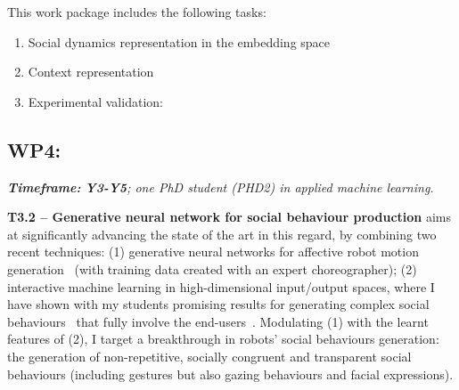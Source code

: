 %
%
%

This work package includes the following tasks:

\begin{enumerate}[label=\textbf{T3.\arabic*}]
    \item{Social dynamics representation in the embedding space}
    \item{Context representation}
    \item{Experimental validation: }
\end{enumerate}



\subsection{WP4: \textbf{\wpFour}}
\emph{    \textbf{Timeframe:} \textbf{Y3-Y5}; one PhD student (PHD2) in applied machine
    learning.}


\textbf{T3.2 -- Generative neural network for social behaviour production}
\project aims at significantly advancing the state of the art in this regard, by
combining two recent techniques: (1) generative neural networks for affective
robot motion generation~\cite{marmpena2019generating,suguitan2020moveae} (with
training data created with an expert choreographer); (2) interactive machine
learning in high-dimensional input/output spaces, where I have shown with my
students promising results for generating complex social
behaviours~\cite{senft2019teaching, winkle2020couch} that fully involve the
end-users~\cite{winkle2018social}. Modulating (1) with the learnt features of
(2), I target a breakthrough in robots' social behaviours generation: the
generation of non-repetitive, socially congruent and transparent social
behaviours (including gestures but also gazing behaviours and facial
expressions).
%
%
%
%

